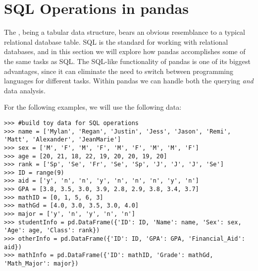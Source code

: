 \begin{comment}
The random walk is shown in Figure \ref{fig:PandasRandomWalk}.

\begin{figure}
\centering
\texttt{[image: randomWalk.pdf]}
\caption{Random walk of length 1000.}
\label{fig:PandasRandomWalk}
\end{figure}

\begin{problem}
Create five random walks of length 100, and plot them together in the same plot.

Next, create a ``biased'' random walk by changing the coin flip probability of head from 0.5 to 0.51.
Plot this biased walk with lengths 100, 10000, and then 100000.
Notice the definite trend that emerges.
Your results should be comparable to those in Figure \ref{pandas:biasedRandomWalk}.
\end{problem}

\begin{figure}
\centering
\texttt{[image: biasedRandomWalk.pdf]}
\caption{Biased random walk of length 100 (above) and 10000 (below).}
\label{pandas:biasedRandomWalk}
\end{figure}
\end{comment}

\section*{SQL Operations in pandas} %

The , being a tabular data structure, bears an obvious resemblance to a typical relational
database table.
SQL is the standard for working with relational databases, and in this section we will
explore how pandas accomplishes some of the same tasks as SQL.
The SQL-like functionality of pandas is
one of its biggest advantages, since it can eliminate the need to switch between programming languages
for different tasks.
Within pandas we can handle both the querying \emph{and} data analysis.

For the following examples, we will use the following data:
\begin{lstlisting}
>>> #build toy data for SQL operations
>>> name = ['Mylan', 'Regan', 'Justin', 'Jess', 'Jason', 'Remi', 'Matt', 'Alexander', 'JeanMarie']
>>> sex = ['M', 'F', 'M', 'F', 'M', 'F', 'M', 'M', 'F']
>>> age = [20, 21, 18, 22, 19, 20, 20, 19, 20]
>>> rank = ['Sp', 'Se', 'Fr', 'Se', 'Sp', 'J', 'J', 'J', 'Se']
>>> ID = range(9)
>>> aid = ['y', 'n', 'n', 'y', 'n', 'n', 'n', 'y', 'n']
>>> GPA = [3.8, 3.5, 3.0, 3.9, 2.8, 2.9, 3.8, 3.4, 3.7]
>>> mathID = [0, 1, 5, 6, 3]
>>> mathGd = [4.0, 3.0, 3.5, 3.0, 4.0]
>>> major = ['y', 'n', 'y', 'n', 'n']
>>> studentInfo = pd.DataFrame({'ID': ID, 'Name': name, 'Sex': sex, 'Age': age, 'Class': rank})
>>> otherInfo = pd.DataFrame({'ID': ID, 'GPA': GPA, 'Financial_Aid': aid})
>>> mathInfo = pd.DataFrame({'ID': mathID, 'Grade': mathGd, 'Math_Major': major})
\end{lstlisting}

